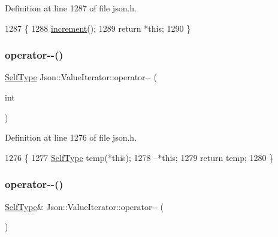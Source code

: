Definition at line 1287 of file json.\+h.


\begin{DoxyCode}
1287                          \{
1288     \hyperlink{class_json_1_1_value_iterator_base_afe58f9534e1fd2033419fd9fe244551e}{increment}();
1289     \textcolor{keywordflow}{return} *\textcolor{keyword}{this};
1290   \}
\end{DoxyCode}
\mbox{\label{class_json_1_1_value_iterator_a06d6a29d96caf6af324a53973159e12b}} 
\subsubsection{\texorpdfstring{operator-\/-\/()}{operator--()}\hspace{0.1cm}{\footnotesize\ttfamily [1/2]}}
{\footnotesize\ttfamily \hyperlink{class_json_1_1_value_iterator_base_a9d2a940d03ea06d20d972f41a89149ee}{Self\+Type} Json\+::\+Value\+Iterator\+::operator-\/-\/ (\begin{DoxyParamCaption}\item[{int}]{ }\end{DoxyParamCaption})\hspace{0.3cm}{\ttfamily [inline]}}



Definition at line 1276 of file json.\+h.


\begin{DoxyCode}
1276                            \{
1277     \hyperlink{class_json_1_1_value_iterator_a23357670fdad61792670d86f62db7e16}{SelfType} temp(*\textcolor{keyword}{this});
1278     --*\textcolor{keyword}{this};
1279     \textcolor{keywordflow}{return} temp;
1280   \}
\end{DoxyCode}
\mbox{\label{class_json_1_1_value_iterator_a811302a868518a0995a9def955df5720}} 
\subsubsection{\texorpdfstring{operator-\/-\/()}{operator--()}\hspace{0.1cm}{\footnotesize\ttfamily [2/2]}}
{\footnotesize\ttfamily \hyperlink{class_json_1_1_value_iterator_base_a9d2a940d03ea06d20d972f41a89149ee}{Self\+Type}\& Json\+::\+Value\+Iterator\+::operator-\/-\/ (\begin{DoxyParamCaption}{ }\end{DoxyParamCaption})\hspace{0.3cm}{\ttfamily [inline]}}



